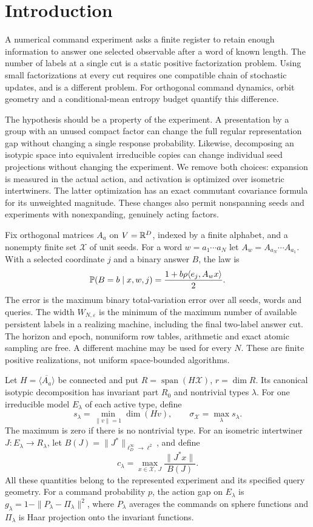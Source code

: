 \section{Introduction}
A numerical command experiment asks a finite register to retain enough
information to answer one selected observable after a word of known
length. The number of labels at a single cut is a static positive
factorization problem. Using small factorizations at every cut requires
one compatible chain of stochastic updates, and is a different problem.
For orthogonal command dynamics, orbit geometry and a conditional-mean
entropy budget quantify this difference.

The hypothesis should be a property of the experiment. A presentation
by a group with an unused compact factor can change the full regular
representation gap without changing a single response probability.
Likewise, decomposing an isotypic space into equivalent irreducible
copies can change individual seed projections without changing the
experiment. We remove both choices: expansion is measured in the
actual action, and activation is optimized over isometric intertwiners.
The latter optimization has an exact commutant covariance formula for
its unweighted magnitude. These changes also permit nonspanning seeds
and experiments with nonexpanding, genuinely acting factors.

Fix orthogonal matrices $A_a$ on $V=\mathbb R^D$, indexed by a finite alphabet,
and a nonempty finite set $\mathcal X$ of unit seeds. For a word
$w=a_1\cdots a_N$ let $A_w=A_{a_N}\cdots A_{a_1}$. With a selected
coordinate $j$ and a binary answer $B$, the law is
\begin{equation}\label{eq:intro-law41}
 \mathbb P(B=b\mid x,w,j)=\frac{1+b\rho\langle e_j,A_wx\rangle}{2}.
\end{equation}
The error is the maximum binary total-variation error over all seeds,
words and queries. The width $W_{N,\varepsilon}$ is the minimum of the
maximum number of available persistent labels in a realizing machine,
including the final two-label answer cut. The horizon and epoch,
nonuniform row tables, arithmetic and exact atomic sampling are free.
A different machine may be used for every $N$. These are finite positive
realizations, not uniform space-bounded algorithms.

Let $H=\overline{\langle A_a\rangle}$ be connected and put
$R=\operatorname{span}(H\mathcal X)$, $r=\dim R$. Its canonical isotypic
decomposition has invariant part $R_0$ and nontrivial types $\lambda$.
For one irreducible model $E_\lambda$ of each active type, define
\[
 s_\lambda=\min_{\|v\|=1}\dim(Hv),\qquad
 \sigma_{\mathcal X}=\max_\lambda s_\lambda.
\]
The maximum is zero if there is no nontrivial type. For an isometric
intertwiner $J:E_\lambda\to R_\lambda$, let
$B(J)=\|J^*\|_{\ell^\infty_D\to\ell^2}$, and define
\[
 c_\lambda=\max_{x\in\mathcal X,\ J}
                     \frac{\|J^*x\|}{B(J)}.
\]
All these quantities belong to the represented experiment and its
specified query geometry. For a command probability $p$, the action
gap on $E_\lambda$ is
$g_\lambda=1-\|P_\lambda-\Pi_\lambda\|^2$, where $P_\lambda$
averages the commands on sphere functions and $\Pi_\lambda$ is Haar
projection onto the invariant functions.

